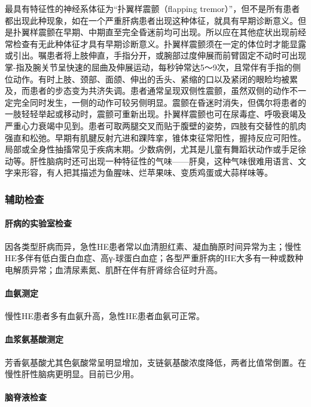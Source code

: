 最具有特征性的神经系体征为“扑翼样震颤（flapping
tremor）”，但不是所有患者都出现此种现象，如在一个严重肝病患者出现这种体征，就具有早期诊断意义。但是扑翼样震颤在早期、中期直至完全昏迷前均可出现。所以应在其他症状出现前经常检查有无此种体征才具有早期诊断意义。扑翼样震颤须在一定的体位时才能显露或引出。嘱患者将上肢伸直，手指分开，或腕部过度伸展而前臂固定不动时可出现掌-指及腕关节呈快速的屈曲及伸展运动，每秒钟常达5～9次，且常伴有手指的侧位动作。有时上肢、颈部、面颌、伸出的舌头、紧缩的口以及紧闭的眼睑均被累及，而患者的步态变为共济失调。患者通常呈现双侧性震颤，虽然双侧的动作不一定完全同时发生，一侧的动作可较另侧明显。震颤在昏迷时消失，但偶尔将患者的一肢轻轻举起或移动时，震颤可重新出现。扑翼样震颤也可在尿毒症、呼吸衰竭及严重心力衰竭中见到。患者可取两腿交叉而贴于腹壁的姿势，四肢有交替性的肌肉强直和松弛。早期有肌腱反射亢进和踝阵挛，锥体束征常阳性，握持反应可阳性。局部或全身性抽搐常见于疾病末期。少数病例，尤其是儿童有舞蹈状动作或手足徐动等。肝性脑病时还可出现一种特征性的气味------肝臭，这种气味很难用语言、文字来形容，有人把其描述为鱼腥味、烂苹果味、变质鸡蛋或大蒜样味等。

\subsubsection{辅助检查}

\paragraph{肝病的实验室检查}

因各类型肝病而异，急性HE患者常以血清胆红素、凝血酶原时间异常为主；慢性HE多伴有低白蛋白血症、高γ-球蛋白血症；各型严重肝病的HE大多有一种或数种电解质异常；血清尿素氮、肌酐在伴有肝肾综合征时升高。

\paragraph{血氨测定}

慢性HE患者多有血氨升高，急性HE患者血氨可正常。

\paragraph{血浆氨基酸测定}

芳香氨基酸尤其色氨酸常呈明显增加，支链氨基酸浓度降低，两者比值常倒置。在慢性肝性脑病更明显。目前已少用。

\paragraph{脑脊液检查}

